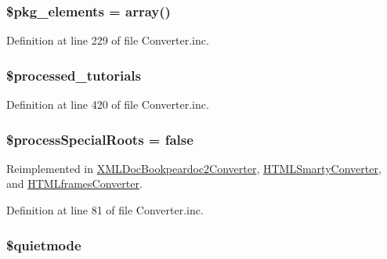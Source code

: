 \hypertarget{class_converter_af833d646cb2d71e00831b24d1cbd9cdf}{
\subsubsection[{\$pkg\-\_\-elements}]{\setlength{\rightskip}{0pt plus 5cm}\$pkg\-\_\-elements = array()}}\label{class_converter_af833d646cb2d71e00831b24d1cbd9cdf}


\-Definition at line 229 of file \-Converter.\-inc.

\hypertarget{class_converter_a415f66dd0ac17505eb89ea7f80de7217}{
\subsubsection[{\$processed\-\_\-tutorials}]{\setlength{\rightskip}{0pt plus 5cm}\$processed\-\_\-tutorials}}\label{class_converter_a415f66dd0ac17505eb89ea7f80de7217}


\-Definition at line 420 of file \-Converter.\-inc.

\hypertarget{class_converter_adcae2bdef17468fc5bf2f15981da497e}{
\subsubsection[{\$process\-Special\-Roots}]{\setlength{\rightskip}{0pt plus 5cm}\$process\-Special\-Roots = false}}\label{class_converter_adcae2bdef17468fc5bf2f15981da497e}


\-Reimplemented in \hyperlink{class_x_m_l_doc_bookpeardoc2_converter_adcae2bdef17468fc5bf2f15981da497e}{\-X\-M\-L\-Doc\-Bookpeardoc2\-Converter}, \hyperlink{class_h_t_m_l_smarty_converter_adcae2bdef17468fc5bf2f15981da497e}{\-H\-T\-M\-L\-Smarty\-Converter}, and \hyperlink{class_h_t_m_lframes_converter_adcae2bdef17468fc5bf2f15981da497e}{\-H\-T\-M\-Lframes\-Converter}.



\-Definition at line 81 of file \-Converter.\-inc.

\hypertarget{class_converter_a7725fd0a145ccfe320caaba1dc15b6e6}{
\subsubsection[{\$quietmode}]{\setlength{\rightskip}{0pt plus 5cm}\$quietmode}}\label{class_converter_a7725fd0a145ccfe320caaba1dc15b6e6}


